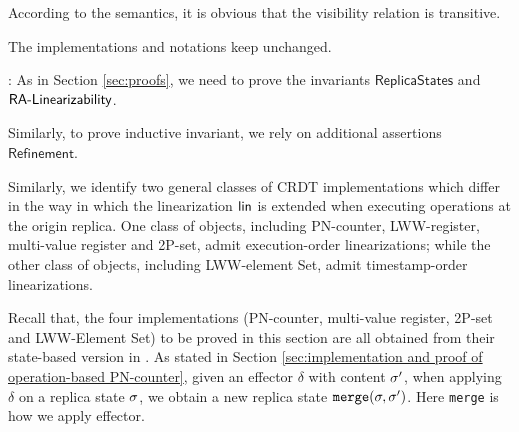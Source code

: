 According to the semantics, it is obvious that the visibility relation is transitive.

 The implementations and notations keep unchanged.

: As in Section \ref{sec:proofs}, we need to prove %
the invariants $\mathsf{ReplicaStates}$ and $\mathsf{\CRDTLinshort{}}$.



Similarly, to prove inductive invariant, we rely on additional assertions $\mathsf{Refinement}$. %

Similarly, we identify two general classes of CRDT implementations which differ in the way in which the linearization $\alinord$ is extended when executing operations at the origin replica. One class of objects, including PN-counter, LWW-register, multi-value register and 2P-set, admit execution-order linearizations; while the other class of objects, including LWW-element Set, admit timestamp-order linearizations.

 Recall that, the four implementations (PN-counter, multi-value register, 2P-set and LWW-Element Set) to be proved in this section are all obtained from their state-based version in \cite{ShapiroPBZ11}. As stated in Section \ref{sec:implementation and proof of operation-based PN-counter}, given an effector $\delta$ with content $\astate'$, when applying $\delta$ on a replica state $\astate$, we obtain a new replica state $\alabelshort[{\tt merge}]{\astate,\astate'}$. Here {\tt merge} is how we apply effector.

